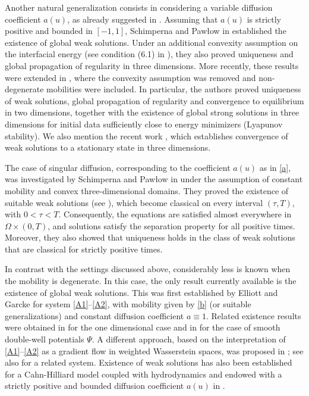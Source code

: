 \documentclass[11pt,  reqno]{amsart}%
\theoremstyle{plain}
\theoremstyle{definition}
\theoremstyle{remark}
\numberwithin{equation}{section}
\begin{document}
Another natural generalization consists in considering a variable diffusion coefficient $a(u)$, as already suggested in \cite{CAHN}. Assuming that $a(u)$ is strictly positive and bounded in $[-1,1]$, Schimperna and Paw\l ow in \cite{SP2011} established the existence of global weak solutions. Under an additional convexity assumption on the interfacial energy (see condition (6.1) in \cite[Theorem 6.1]{SP2011}), they also proved uniqueness and global propagation of regularity in three dimensions.
More recently, these results were extended in \cite{CGGS2025}, where the convexity assumption was removed and non-degenerate mobilities were included. In particular, the authors proved uniqueness of weak solutions, global propagation of regularity and convergence to equilibrium in two dimensions, together with the existence of global strong solutions in three dimensions for initial data sufficiently close to energy minimizers (Lyapunov stability). We also mention the recent work \cite{GP2026}, which establishes convergence of weak solutions to a stationary state in three dimensions.

The case of singular diffusion, corresponding to the coefficient $a(u)$ as in \eqref{a}, was investigated by Schimperna and Paw\l ow in \cite{SP2013} 
under the assumption of constant mobility and convex three-dimensional domains. They proved the existence of suitable weak solutions (see \cite[Definition 2.3]{SP2013}), which become classical on every interval $(\tau, T)$, with $0<\tau<T$. Consequently, the equations are satisfied almost everywhere in $\Omega \times (0,T)$, and solutions satisfy the separation property for all positive times. Moreover, they also showed that uniqueness holds in the class of weak solutions that are classical for strictly positive times.

In contrast with the settings discussed above, considerably less is known when the mobility is degenerate. In this case, the only result currently 
available is the existence of global weak solutions. This was first established by Elliott and Garcke \cite{EG1996} for system \eqref{A1}--\eqref{A2}, with mobility given by \eqref{b} (or suitable generalizations) and constant diffusion coefficient $a\equiv 1$. Related existence results were obtained in \cite{YIN} for the one dimensional case and in \cite{DD2016} for the case of smooth double-well potentials $\Psi$. A different approach, based on the interpretation of \eqref{A1}--\eqref{A2} as a gradient flow in weighted Wasserstein spaces, was proposed in \cite{LMS2012}; see also \cite{CMN2019} for a related system. Existence of weak solutions has also been established for a Cahn-Hilliard model coupled with hydrodynamics and endowed with a strictly positive and bounded diffusion coefficient $a(u)$ in \cite{ADG2013-2}.
\end{document}
